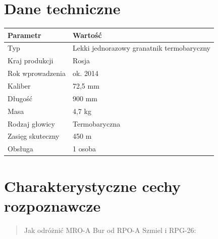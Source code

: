 \documentclass[12pt,openany,oneside]{book}
\begin{document}
\section{Dane techniczne}\label{dane-techniczne-78}

\begin{longtable}[]{@{}ll@{}}
\toprule\noalign{}
Parametr & Wartość \\
\midrule\noalign{}
\endhead
\bottomrule\noalign{}
\endlastfoot
Typ & Lekki jednorazowy granatnik termobaryczny \\
Kraj produkcji & Rosja \\
Rok wprowadzenia & ok. 2014 \\
Kaliber & 72,5 mm \\
Długość & 900 mm \\
Masa & 4,7 kg \\
Rodzaj głowicy & Termobaryczna \\
Zasięg skuteczny & 450 m \\
Obsługa & 1 osoba \\
\end{longtable}

\section{Charakterystyczne cechy
rozpoznawcze}\label{charakterystyczne-cechy-rozpoznawcze-78}

\begin{quote}
Jak odróżnić MRO-A Bur od RPO-A Szmiel i RPG-26:
\end{quote}
\end{document}
